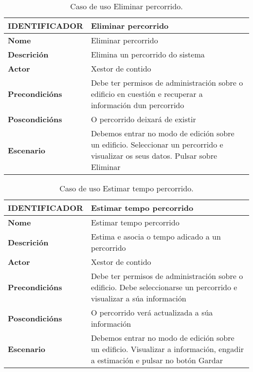 \begin{table}[tbh]
	\footnotesize
	\centering
	\begin{tabular}{|l|p{10cm}|}
		\hline 
		\textbf{IDENTIFICADOR}	& \textbf{Eliminar percorrido} \\ 
		\hline 
		\textbf{Nome} & Eliminar percorrido \\ 
		\hline 
		\textbf{Descrición} & Elimina un percorrido do sistema \\ 
		\hline 
		\textbf{Actor} & Xestor de contido \\ 
		\hline 
		\textbf{Precondicións} & Debe ter permisos de administración sobre o edificio en cuestión e recuperar a información dun percorrido \\ 
		\hline 
		\textbf{Poscondicións} & O percorrido deixará de existir \\ 
		\hline 
		\textbf{Escenario} & Debemos entrar no modo de edición sobre un edificio. Seleccionar un percorrido e visualizar os seus datos. Pulsar sobre Eliminar \\ 
		\hline 
	\end{tabular}
	\caption{Caso de uso Eliminar percorrido.}
	\label{tab:cuEliminarPercorrido}
\end{table}

\begin{table}[tbh]
	\footnotesize
	\centering
	\begin{tabular}{|l|p{10cm}|}
		\hline 
		\textbf{IDENTIFICADOR}	& \textbf{Estimar tempo percorrido} \\ 
		\hline 
		\textbf{Nome} & Estimar tempo percorrido \\ 
		\hline 
		\textbf{Descrición} & Estima e asocia o tempo adicado a un percorrido \\ 
		\hline 
		\textbf{Actor} & Xestor de contido \\ 
		\hline 
		\textbf{Precondicións} & Debe ter permisos de administración sobre o edificio. Debe seleccionarse un percorrido e visualizar a súa información \\ 
		\hline 
		\textbf{Poscondicións} & O percorrido verá actualizada a súa información \\ 
		\hline 
		\textbf{Escenario} & Debemos entrar no modo de edición sobre un edificio. Visualizar a información, engadir a estimación e pulsar no botón Gardar \\ 
		\hline 
	\end{tabular}
	\caption{Caso de uso Estimar tempo percorrido.}
	\label{tab:cuEstimarTempoPercorrido}
\end{table}

